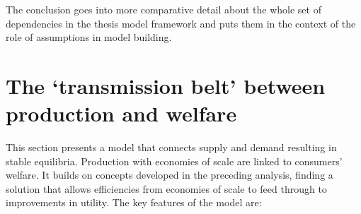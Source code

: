 The conclusion goes into more comparative detail about the whole set of dependencies in the thesis model framework and puts them in the context of the role of assumptions in model building.

\section{The `transmission belt' between production and welfare \label{sec:prodtowelfare}}

This section presents a model that connects supply and demand resulting in stable equilibria. Production with economies of scale are linked to consumers' welfare. It builds on concepts developed in the preceding analysis, finding a solution that allows efficiencies from economies of scale to feed through to improvements in utility. The key features of the model are:

